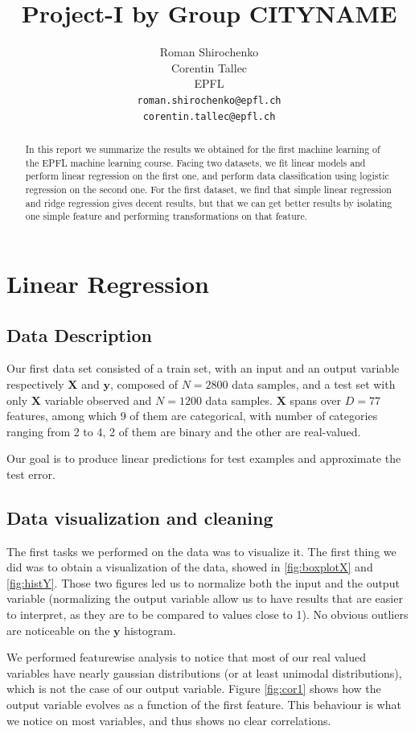 \documentclass{article} %
\title{Project-I by Group CITYNAME}
\author{
Roman Shirochenko\\
Corentin Tallec\\
EPFL \\
\texttt{roman.shirochenko@epfl.ch}\\
\texttt{corentin.tallec@epfl.ch} \\
}
\begin{document}
\maketitle

\begin{abstract}
	In this report we summarize the results we obtained for the first machine
	learning of the EPFL machine learning course. Facing two datasets, we fit
	linear models and perform linear regression on the first one, and perform data
	classification using logistic regression on the second one. For the first
	dataset, we find that simple linear regression and ridge regression gives
	decent results, but that we can get better results by isolating one simple
	feature and performing transformations on that feature.
\end{abstract}

\section{Linear Regression}
\subsection{Data Description}
Our first data set consisted of a train set, with an input and an output
variable respectively $\mathbf{X}$ and $\mathbf{y}$, composed of $N=2800$ data
samples, and a test set with only $\mathbf{X}$ variable observed and $N=1200$
data samples. $\mathbf{X}$ spans over $D=77$ features, among which 9 of them are
categorical, with number of categories ranging from 2 to 4, 2 of them are binary
and the other are real-valued.

Our goal is to produce linear predictions for test examples and approximate the
test error.

\subsection{Data visualization and cleaning}
The first tasks we performed on the data was to visualize it. The first thing we
did was to obtain a visualization of the data, showed in \ref{fig:boxplotX} and
\ref{fig:histY}. Those two figures led us to normalize both the input and the
output variable (normalizing the output variable allow us to have results that are
easier to interpret, as they are to be compared to values close to 1). No
obvious outliers are noticeable on the $\mathbf{y}$ histogram.

We performed featurewise analysis to notice that most of our real valued
variables have nearly gaussian distributions (or at least unimodal
distributions), which is not the case of our output variable. Figure
\ref{fig:cor1} shows how the output variable evolves as a function of the first
feature. This behaviour is what we notice on most variables, and thus shows no
clear correlations.
\end{document}
